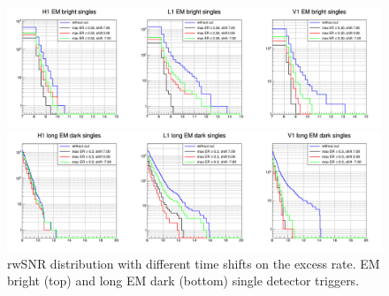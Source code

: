 \begin{figure}
  \centering
  \begin{minipage}{\linewidth}
    \centering
    \includegraphics[width=\textwidth]{sectionSelection/plotsAroundSingles/cCumulERtimeShift_bright.png}    
  \end{minipage}
  \hfill
  \begin{minipage}{\linewidth}
    \centering
    \includegraphics[width=\textwidth]{sectionSelection/plotsAroundSingles/cCumulERtimeShift.png}
  \end{minipage}
  \caption{rwSNR distribution with different time shifts on the excess rate. EM bright (top) and long EM dark (bottom) single detector triggers.}
  \label{fig:erTimeShift}
\end{figure}
% 
% 

